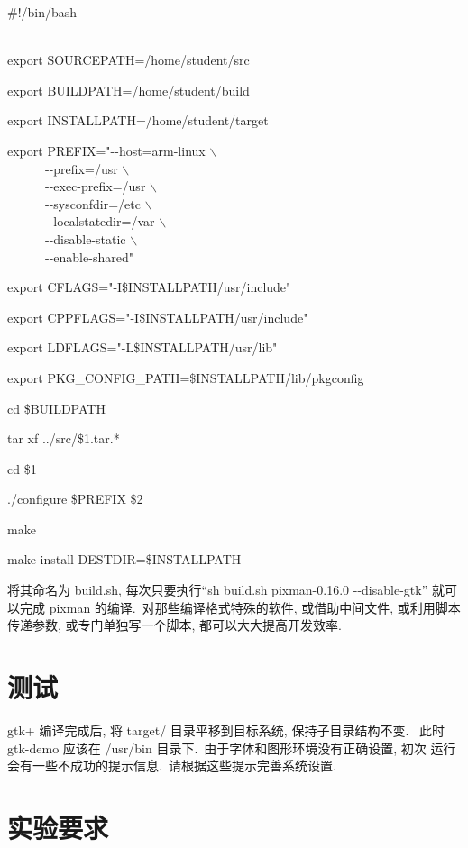 \begin{boxedminipage}{.8\textwidth}
\setlength{\parindent}{0em}
   \#!/bin/bash\\ \ 

   export SOURCEPATH=/home/student/src

   export BUILDPATH=/home/student/build

   export INSTALLPATH=/home/student/target

   export PREFIX="-{}-host=arm-linux $\backslash$\\
   　　　-{}-prefix=/usr    $\backslash$\\
   　　　-{}-exec-prefix=/usr    $\backslash$\\
   　　　-{}-sysconfdir=/etc   $\backslash$\\
   　　　-{}-localstatedir=/var $\backslash$\\
   　　　-{}-disable-static  $\backslash$\\
   　　　-{}-enable-shared"

   export CFLAGS="-I\${INSTALLPATH}/usr/include"

   export CPPFLAGS="-I\${INSTALLPATH}/usr/include"

   export LDFLAGS="-L\${INSTALLPATH}/usr/lib"

   export PKG\_CONFIG\_PATH=\${INSTALLPATH}/lib/pkgconfig

   cd \$BUILDPATH

   tar xf ../src/\$1.tar.*

   cd \$1

   ./configure \${PREFIX} \$2

   make
   
   make install DESTDIR=\${INSTALLPATH}
\end{boxedminipage}

将其命名为 build.sh, 每次只要执行``sh build.sh pixman-0.16.0 -{}-disable-gtk''
就可以完成 pixman 的编译.~对那些编译格式特殊的软件, 或借助中间文件, 或利用脚本
传递参数, 或专门单独写一个脚本, 都可以大大提高开发效率.

\section{测试}
    gtk+ 编译完成后, 将 target/ 目录平移到目标系统, 保持子目录结构不变.~
此时 gtk-demo 应该在 /usr/bin 目录下.~由于字体和图形环境没有正确设置, 初次
运行会有一些不成功的提示信息.~请根据这些提示完善系统设置.

\section{实验要求}

\clearpage
